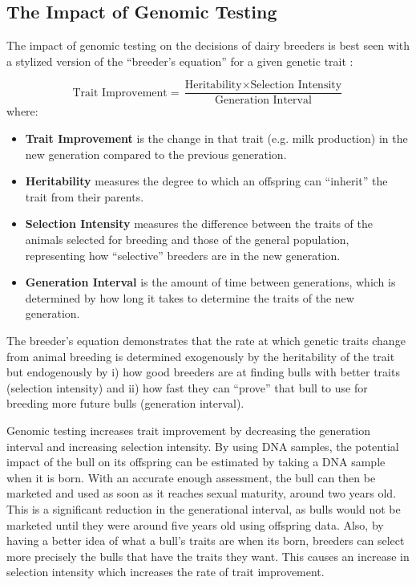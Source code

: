 \documentclass[12pt,letterpaper]{article}
\begin{document}
\subsection{The Impact of Genomic Testing}
The impact of genomic testing on the decisions of dairy breeders is best seen with a stylized version of the ``breeder's equation'' for a given genetic trait \citep{Kerr1984}:

\begin{equation}
    \text{Trait Improvement} = \frac{\text{Heritability}\times \text{Selection Intensity}}{\text{Generation Interval}}\label{eq:1}
\end{equation}
where:
\begin{itemize}
\item \textbf{Trait Improvement} is the change in that trait (e.g. milk production) in the new generation compared to the previous generation.
\item \textbf{Heritability} measures the degree to which an offspring can ``inherit'' the trait from their parents.
\item \textbf{Selection Intensity} measures the difference between the traits of the animals selected for breeding and those of the general population, representing how ``selective'' breeders are in the new generation.
\item \textbf{Generation Interval} is the amount of time between generations, which is determined by how long it takes to determine the traits of the new generation.
\end{itemize}

The breeder's equation demonstrates that the rate at which genetic traits change from animal breeding is determined exogenously by the heritability of the trait but endogenously by i) how good breeders are at finding bulls with better traits (selection intensity) and ii) how fast they can ``prove'' that bull to use for breeding more future bulls (generation interval). 

Genomic testing increases trait improvement by decreasing the generation interval and increasing selection intensity.
By using DNA samples, the potential impact of the bull on its offspring can be estimated by taking a DNA sample when it is born.
With an accurate enough assessment, the bull can then be marketed and used as soon as it reaches sexual maturity, around two years old.
This is a significant reduction in the generational interval, as bulls would not be marketed until they were around five years old using offspring data.
Also, by having a better idea of what a bull's traits are when its born, breeders can select more precisely the bulls that have the traits they want.
This causes an increase in selection intensity which increases the rate of trait improvement.
\end{document}
